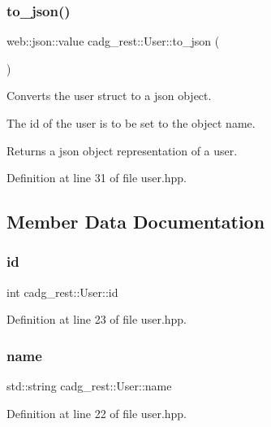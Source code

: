 \subsubsection{\texorpdfstring{to\_json()}{to\_json()}}
{\footnotesize\ttfamily web\+::json\+::value cadg\+\_\+rest\+::\+User\+::to\+\_\+json (\begin{DoxyParamCaption}{ }\end{DoxyParamCaption})\hspace{0.3cm}{\ttfamily [inline]}}



Converts the user struct to a json object. 

The id of the user is to be set to the object name. \begin{DoxyReturn}{Returns}
a json object representation of a user. 
\end{DoxyReturn}


Definition at line 31 of file user.\+hpp.



\subsection{Member Data Documentation}
\mbox{\label{structcadg__rest_1_1_user_a8807495983130f0fca238fa6ccc8feb5}} 
\subsubsection{\texorpdfstring{id}{id}}
{\footnotesize\ttfamily int cadg\+\_\+rest\+::\+User\+::id}



Definition at line 23 of file user.\+hpp.

\mbox{\label{structcadg__rest_1_1_user_aaf5fe7f6fdc4d229206f319395548e67}} 
\subsubsection{\texorpdfstring{name}{name}}
{\footnotesize\ttfamily std\+::string cadg\+\_\+rest\+::\+User\+::name}



Definition at line 22 of file user.\+hpp.

